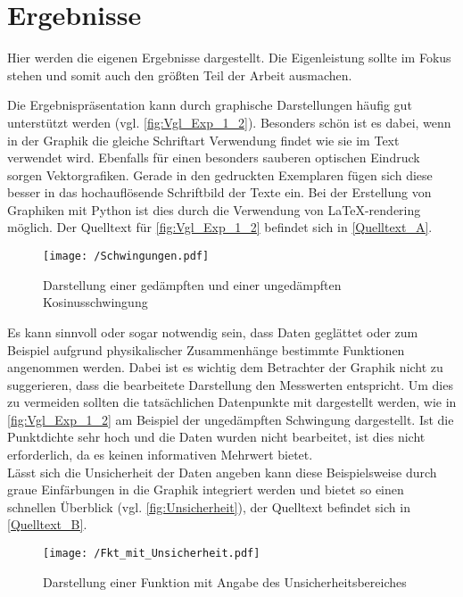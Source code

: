 \chapter{Ergebnisse}
\label{cpt:Ergebnisse}

Hier werden die eigenen Ergebnisse dargestellt. Die Eigenleistung sollte im Fokus stehen und somit auch den größten Teil der Arbeit ausmachen. 

Die Ergebnispräsentation kann durch graphische Darstellungen häufig gut unterstützt werden (vgl. \autoref{fig:Vgl_Exp_1_2}).
Besonders schön ist es dabei, wenn in der Graphik die gleiche Schriftart Verwendung findet wie sie im Text verwendet wird. Ebenfalls für einen besonders sauberen optischen Eindruck sorgen Vektorgrafiken. Gerade in den gedruckten Exemplaren fügen sich diese besser in das hochauflösende Schriftbild der Texte ein. Bei der Erstellung von Graphiken mit Python ist dies durch die Verwendung von \LaTeX -rendering möglich. Der Quelltext für \autoref{fig:Vgl_Exp_1_2} befindet sich in \autoref{Quelltext_A}. 

\begin{figure}[H]
	\centering
	\texttt{[image: /Schwingungen.pdf]}
	\caption[Darstellung verschiedener Kosinunsschwingungen]{Darstellung einer gedämpften und einer ungedämpften Kosinusschwingung}
	\label{fig:Vgl_Exp_1_2}
\end{figure}

Es kann sinnvoll oder sogar notwendig sein, dass Daten geglättet oder zum Beispiel aufgrund physikalischer Zusammenhänge bestimmte Funktionen angenommen werden. Dabei ist es wichtig dem Betrachter der Graphik nicht zu suggerieren, dass die bearbeitete Darstellung den Messwerten entspricht. Um dies zu vermeiden sollten die tatsächlichen Datenpunkte mit dargestellt werden, wie in \autoref{fig:Vgl_Exp_1_2} am Beispiel der ungedämpften Schwingung dargestellt. Ist die Punktdichte sehr hoch und die Daten wurden nicht bearbeitet, ist dies nicht erforderlich, da es keinen informativen Mehrwert bietet.\\ 

Lässt sich die Unsicherheit der Daten angeben kann diese Beispielsweise durch graue Einfärbungen in die Graphik integriert werden und bietet so einen schnellen Überblick (vgl. \autoref{fig:Unsicherheit}), der Quelltext befindet sich in \autoref{Quelltext_B}. 

\begin{figure}[H]
	\centering
	\texttt{[image: /Fkt\_mit\_Unsicherheit.pdf]}
	\caption{Darstellung einer Funktion mit Angabe des Unsicherheitsbereiches}
	\label{fig:Unsicherheit}
\end{figure}

